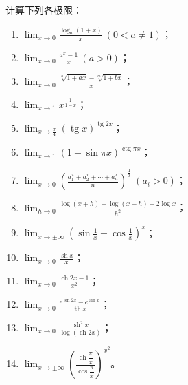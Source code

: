\begin{exercise}
	\item 计算下列各极限：
	\begin{enumerate}[label=\arabic*)]
		\item \(\displaystyle\lim_{x\to0}\frac{\log_a(1+x)}x\ (0<a\neq1)\)；
		\item \(\displaystyle\lim_{x\to0}\frac{a^x-1}x\ (a>0)\)；
		\item \(\displaystyle\lim_{x\to0}\frac{\sqrt[n]{1+ax}-\sqrt[m]{1+bx}}x\)；
		\item \(\displaystyle\lim_{x\to1}x^{\frac1{1-x}}\)；
		\item \(\displaystyle\lim_{x\to\frac\pi4}(\operatorname{tg}x)^{\operatorname{tg}2x}\)；
		\item \(\displaystyle\lim_{x\to1}(1+\sin\pi x)^{\operatorname{ctg}\pi x}\)；
		\item \(\displaystyle\lim_{x\to0}\left(\frac{a_1^x+a_2^x+\cdots+a_n^x}{n}\right)^{\frac1x}\ (a_i>0)\)；
		\item \(\displaystyle\lim_{h\to0}\frac{\log(x+h)+\log(x-h)-2\log x}{h^2}\)；
		\item \(\displaystyle\lim_{x\to\pm\infty}\left(\sin\frac1x+\cos\frac1x\right)^x\)；
		\item \(\displaystyle\lim_{x\to0}\frac{\operatorname{sh}x}{x}\)；
		\item \(\displaystyle\lim_{x\to0}\frac{\operatorname{ch}2x-1}{x^2}\)；
		\item \(\displaystyle\lim_{x\to0}\frac{e^{\sin2x}-e^{\sin x}}{\operatorname{th}x}\)；
		\item \(\displaystyle\lim_{x\to0}\frac{\operatorname{sh}^2x}{\log(\operatorname{ch}2x)}\)；
		\item \(\displaystyle\lim_{x\to\pm\infty}\left(\frac{\operatorname{ch}\dfrac\pi x}{\cos\dfrac\pi x}\right)^{x^2}\)。
	\end{enumerate}
\end{exercise}


